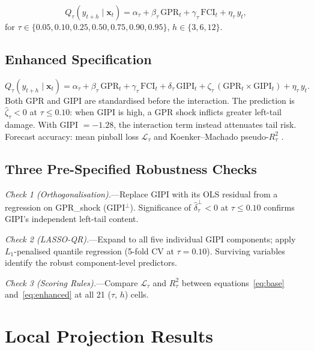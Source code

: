 \documentclass[12pt]{article}
\begin{document}
\begin{equation}
Q_\tau(y_{t+h} \mid \mathbf{x}_t)
= \alpha_\tau + \beta_\tau\,\text{GPR}_t
+ \gamma_\tau\,\text{FCI}_t + \eta_\tau\,y_t,
\label{eq:base}
\end{equation}
for $\tau \in \{0.05, 0.10, 0.25, 0.50, 0.75, 0.90, 0.95\}$,
$h \in \{3, 6, 12\}$.

\subsection{Enhanced Specification}

\begin{equation}
Q_\tau(y_{t+h} \mid \mathbf{x}_t)
= \alpha_\tau + \beta_\tau\,\text{GPR}_t + \gamma_\tau\,\text{FCI}_t
+ \delta_\tau\,\text{GIPI}_t
+ \zeta_\tau\,(\text{GPR}_t \times \text{GIPI}_t)
+ \eta_\tau\,y_t.
\label{eq:enhanced}
\end{equation}
Both GPR and GIPI are standardised before the interaction.
The prediction is $\hat{\zeta}_\tau < 0$ at $\tau \leq 0.10$:
when GIPI is high, a GPR shock inflicts greater left-tail damage.
With GIPI $= -1.28$, the interaction term instead attenuates tail risk.
Forecast accuracy: mean pinball loss $\mathcal{L}_\tau$ and
Koenker--Machado pseudo-$R^2_\tau$ \citep{koenker1999}.

\subsection{Three Pre-Specified Robustness Checks}

\textit{Check 1 (Orthogonalisation).}---Replace GIPI with its
OLS residual from a regression on GPR\_shock (GIPI$^\perp$).
Significance of $\hat{\delta}^\perp_\tau < 0$ at $\tau \leq 0.10$
confirms GIPI's independent left-tail content.

\textit{Check 2 (LASSO-QR).}---Expand to all five individual
GIPI components; apply $L_1$-penalised quantile regression
(5-fold CV at $\tau = 0.10$).
Surviving variables identify the robust component-level predictors.

\textit{Check 3 (Scoring Rules).}---Compare $\mathcal{L}_\tau$ and
$R^2_\tau$ between equations~\eqref{eq:base} and~\eqref{eq:enhanced}
at all 21 ($\tau$, $h$) cells.

\section{Local Projection Results}\label{sec:lp}
\end{document}
